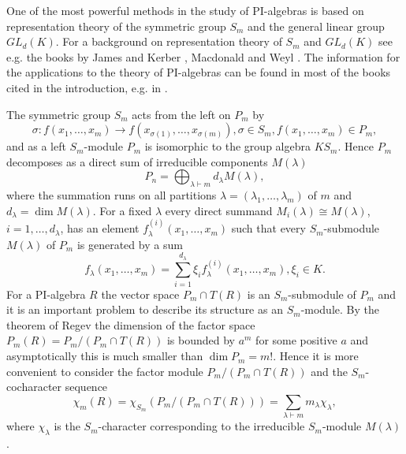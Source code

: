 \documentclass[12pt]{amsart}
\theoremstyle{definition}
\begin{document}
One of the most powerful methods in the study of PI-algebras is based on representation theory of the symmetric group $S_m$ and the general linear group $GL_d(K)$.
For a background on representation theory of $S_m$ and $GL_d(K)$ see e.g. the books by James and Kerber \cite{JamKer}, Macdonald \cite{Mac} and Weyl \cite{We}.
The information for the applications to the theory of PI-algebras can be found in most of the books cited in the introduction, e.g. in \cite[Chapter 12]{Dr3}.

The symmetric group $S_m$ acts from the left on $P_m$ by
\[
\sigma:f(x_1,\ldots,x_m)\to f(x_{\sigma(1)},\ldots,x_{\sigma(m)}),\sigma\in S_m,f(x_1,\ldots,x_m)\in P_m,
\]
and as a left $S_m$-module $P_m$ is isomorphic to the group algebra $KS_m$. Hence $P_m$ decomposes as a direct sum of irreducible components $M(\lambda)$
\[
P_n=\bigoplus_{\lambda\vdash m}d_{\lambda}M(\lambda),
\]
where the summation runs on all partitions $\lambda=(\lambda_1,\ldots,\lambda_m)$ of $m$ and $d_{\lambda}=\dim M(\lambda)$.
For a fixed $\lambda$ every direct summand $M_i(\lambda)\cong M(\lambda)$, $i=1,\ldots,d_{\lambda}$, has an element $f^{(i)}_{\lambda}(x_1,\ldots,x_m)$ such that
every $S_m$-submodule $M(\lambda)$ of $P_m$ is generated by a sum
\[
f_{\lambda}(x_1,\ldots,x_m)=\sum_{i=1}^{d_{\lambda}}\xi_if^{(i)}_{\lambda}(x_1,\ldots,x_m),\xi_i\in K.
\]
For a PI-algebra $R$ the vector space $P_m\cap T(R)$ is an $S_m$-submodule of $P_m$ and it is an important problem to describe its structure as an $S_m$-module.
By the theorem of Regev \cite{Reg} the dimension of the factor space $P_m(R)=P_m/(P_m\cap T(R))$ is bounded by $a^m$ for some positive $a$ and asymptotically this is much smaller than
$\dim P_m=m!$. Hence it is more convenient to consider the factor module $P_m/(P_m\cap T(R))$ and the $S_m$-cocharacter sequence
\[
\chi_m(R)=\chi_{S_m}(P_m/(P_m\cap T(R)))=\sum_{\lambda\vdash m}m_{\lambda}\chi_{\lambda},
\]
where $\chi_{\lambda}$ is the $S_m$-character corresponding to the irreducible $S_m$-module $M(\lambda)$.
\end{document}
